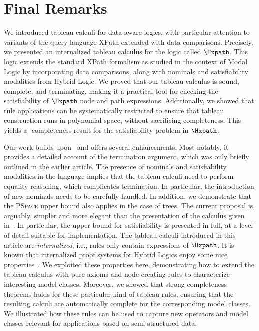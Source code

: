 \section{Final Remarks}
\label{sec:final}

We introduced tableau calculi for data-aware logics, with particular attention to variants of the query language XPath extended with data comparisons. Precisely, we presented an internalized tableau calculus for the logic called $\Hxpath$. This logic extends the standard XPath formalism as studied in the context of Modal Logic by incorporating data comparisons, along with nominals and satisfiability modalities from Hybrid Logic.
We proved that our tableau calculus is sound, complete, and terminating, making it a practical tool for checking the satisfiability of $\Hxpath$ node and path expressions. Additionally, we showed that rule applications can be systematically restricted to ensure that tableau construction runs in polynomial space, without sacrificing completeness. This yields a \pspace-completeness result for the satisfiability problem in $\Hxpath$.

Our work builds upon~\cite{ArecesFS17} and offers several enhancements. Most notably, it provides a detailed account of the termination argument, which was only briefly outlined in the earlier article. The presence of nominals and satisfiability modalities in the language implies that the tableau calculi need to perform equality reasoning, which complicates termination. In particular, the introduction of new nominals needs to be carefully handled.  In addition, we demonstrate that the \textsc{PSpace} upper bound also applies in the case of trees.
The current proposal is, arguably, simpler and more elegant than the presentation of the calculus given in~\cite{ArecesFS17}.  In particular, the \pspace upper bound for satisfiability is presented in full, at a level of detail suitable for implementation. The tableau calculi introduced in this article are \emph{internalized}, i.e., rules only contain expressions of $\Hxpath$. It is known that internalized proof systems for Hybrid Logics enjoy some nice properties~\cite{Blackburn00,Blackburn2002BeyondPA}. We exploited these properties here, demonstrating how to extend the tableau calculus with pure axioms and node creating rules to characterize interesting model classes. Moreover, we showed that strong completeness theorems holds for these particular kind of tableau rules, ensuring that the resulting calculi are automatically complete for the corresponding model classes.  We illustrated how these rules can be used to capture new operators and model classes relevant for applications based on semi-structured data. 

